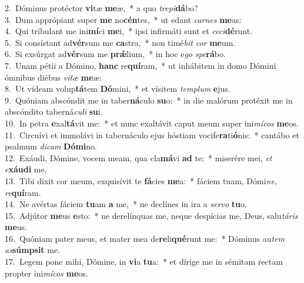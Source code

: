 {2.~}Dóminus protéctor \textbf{vi}tæ \textbf{me}æ,~* a quo \textit{tre}\textit{pi}\textbf{dá}bo?\\
{3.~}Dum apprópiant super \textbf{me} no\textbf{cén}tes,~* ut edant \textit{car}\textit{nes} \textbf{me}as:\\
{4.~}Qui tríbulant me ini\textbf{mí}ci \textbf{me}i,~* ipsi infirmáti sunt et \textit{ce}\textit{ci}\textbf{dé}runt.\\
{5.~}Si consístant ad\textbf{vér}sum me \textbf{ca}stra,~* non timé\textit{bit} \textit{cor} \textbf{me}um.\\
{6.~}Si exsúrgat ad\textbf{vér}sum me \textbf{prǽ}lium,~* in hoc e\textit{go} \textit{spe}\textbf{rá}bo.\\
{7.~}Unam pétii a Dómino, \textbf{hanc} re\textbf{quí}ram,~* ut inhábitem in domo Dómini ómnibus diébus \textit{vi}\textit{tæ} \textbf{me}æ:\\
{8.~}Ut vídeam volup\textbf{tá}tem \textbf{Dó}mini,~* et vísitem \textit{tem}\textit{plum} \textbf{e}jus.\\
{9.~}Quóniam abscóndit me in taber\textbf{ná}culo \textbf{su}o:~* in die malórum protéxit me in abscóndito taberná\textit{cu}\textit{li} \textbf{su}i.\\
{10.~}In petra \textbf{e}xal\textbf{tá}vit me:~* et nunc exaltávit caput meum super ini\textit{mí}\textit{cos} \textbf{me}os.\\
{11.~}Circuívi et immolávi in tabernáculo ejus hóstiam vocife\textbf{ra}ti\textbf{ó}nis:~* cantábo et psalmum \textit{di}\textit{cam} \textbf{Dó}\textbf{mi}no.\\
{12.~}Exáudi, Dómine, vocem meam, qua cla\textbf{má}vi \textbf{ad} te:~* miserére mei, \textit{et} \textit{e}\textbf{xáu}\textbf{di} me.\\
{13.~}Tibi dixit cor meum, exquisívit te \textbf{fá}cies \textbf{me}a:~* fáciem tuam, Dómi\textit{ne}, \textit{re}\textbf{quí}ram.\\
{14.~}Ne avértas fáciem \textbf{tu}am \textbf{a} me,~* ne declínes in ira a \textit{ser}\textit{vo} \textbf{tu}o.\\
{15.~}Adjútor \textbf{me}us \textbf{e}sto:~* ne derelínquas me, neque despícias me, Deus, salu\textit{tá}\textit{ris} \textbf{me}us.\\
{16.~}Quóniam pater meus, et mater mea de\textbf{re}li\textbf{qué}runt me:~* Dóminus au\textit{tem} \textit{as}\textbf{súm}\textbf{psit} me.\\
{17.~}Legem pone mihi, Dómine, in \textbf{vi}a \textbf{tu}a:~* et dírige me in sémitam rectam propter ini\textit{mí}\textit{cos} \textbf{me}os.\\
